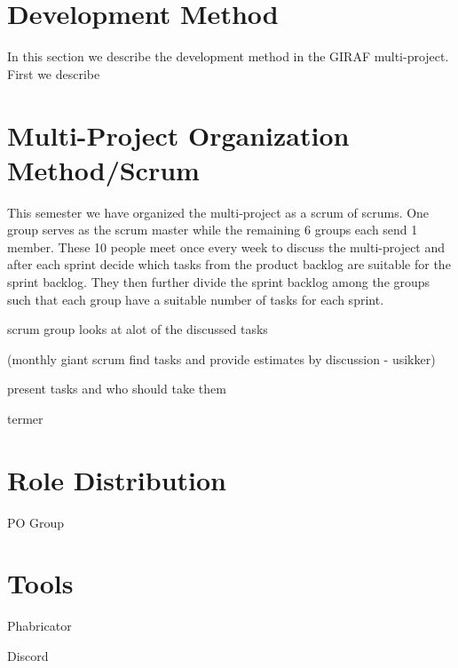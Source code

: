 \section{Development Method}
In this section we describe the development method in the GIRAF multi-project.
First we describe 




\section{Multi-Project Organization Method/Scrum}
 This semester we have organized the multi-project as a scrum of
scrums. One group serves as the scrum master while the remaining 6 groups each send 1
member. These 10 people meet once every week to discuss the multi-project
and after each sprint decide which tasks from the product backlog are suitable
for the sprint backlog. They then further divide the sprint backlog among the
groups such that each group have a suitable number of tasks for each sprint.\nl








scrum group looks at alot of the discussed tasks

(monthly giant scrum find tasks and provide estimates by discussion - usikker)

present tasks and who should take them

termer

\section{Role Distribution}

PO Group



\section{Tools}

Phabricator

Discord
